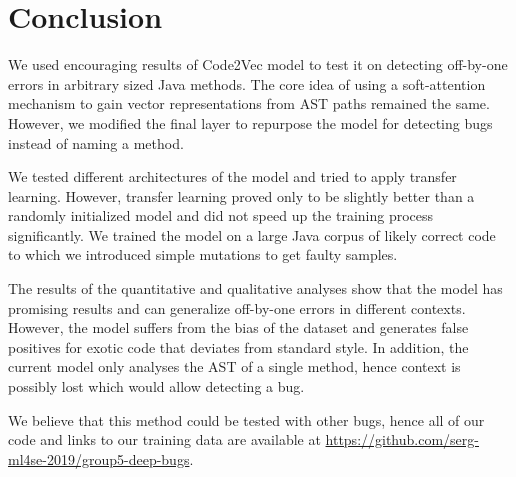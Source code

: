 \section{Conclusion} \label{sec:conclusion}
We used encouraging results of Code2Vec model to test it on detecting off-by-one errors in arbitrary sized Java methods. The core idea of using a soft-attention mechanism to gain vector representations from AST paths remained the same. However, we modified the final layer to repurpose the model for detecting bugs instead of naming a method.

We tested different architectures of the model and tried to apply transfer learning. However, transfer learning proved only to be slightly better than a randomly initialized model and did not speed up the training process significantly. We trained the model on a large Java corpus of likely correct code to which we introduced simple mutations to get faulty samples.

The results of the quantitative and qualitative analyses show that the model has promising results and can generalize off-by-one errors in different contexts. However, the model suffers from the bias of the dataset and generates false positives for exotic code that deviates from standard style. In addition, the current model only analyses the AST of a single method, hence context is possibly lost which would allow detecting a bug.

We believe that this method could be tested with other bugs, hence all of our code and links to our training data are available at \url{https://github.com/serg-ml4se-2019/group5-deep-bugs}.